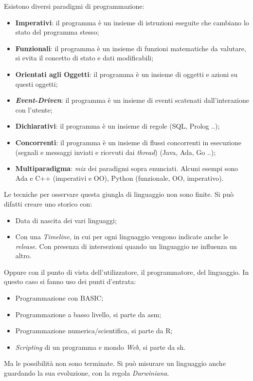 \documentclass[10pt,a4paper]{book}
\begin{document}
Esistono diversi paradigmi di programmazione:
\begin{itemize}
\item \textbf{Imperativi}: il programma \`e un insieme di istruzioni eseguite  che cambiano lo stato del programma stesso;
\item \textbf{Funzionali}: il programma \`e un insieme di funzioni matematiche da valutare, si evita il concetto di stato e dati modificabili;
\item \textbf{Orientati agli Oggetti}: il programma \`e un insieme di oggetti e azioni su questi oggetti;
\item \textbf{\textit{Event-Driven}}: il programma \`e un insieme di eventi scatenati dall'interazione con l'utente;
\item \textbf{Dichiarativi}: il programma \`e un insieme di regole (SQL, Prolog ..);
\item \textbf{Concorrenti}: il programma \`e un insieme di flussi concorrenti in esecuzione (segnali e messaggi inviati e ricevuti dai \textit{thread}) (Java, Ada, Go ..);
\item \textbf{Multiparadigma}: \textit{mix} dei paradigmi sopra enunciati. Alcuni esempi sono Ada e C++ (imperativi e OO), Python (funzionale, OO, imperativo).
\end{itemize}
\noindent
Le tecniche per osservare questa giungla di linguaggio non sono finite. Si pu\`o difatti creare uno storico con:
\begin{itemize}
\item Data di nascita dei vari linguaggi;
\item Con una \textit{Timeline}, in cui per ogni linguaggio vengono indicate anche le \textit{release}. Con presenza di intersezioni quando un linguaggio ne influenza un altro.
\end{itemize}
\noindent
Oppure con il punto di vista dell'utilizzatore, il programmatore, del linguaggio. In questo caso si fanno uso dei punti d'entrata:
\begin{itemize}
\item Programmazione con BASIC;
\item Programmazione a basso livello, si parte da asm;
\item Programmazione numerica/scientifica, si parte da R;
\item \textit{Scripting} di un programma e mondo \textit{Web}, si parte da sh.
\end{itemize}
\noindent
Ma le possibilit\`a non sono terminate. Si pu\`o misurare un linguaggio anche guardando la sua evoluzione, con la regola \textit{Darwiniana}.
\end{document}
